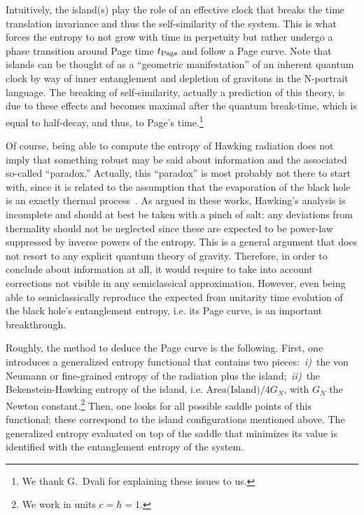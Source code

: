 \documentclass[a4paper, 12pt]{article}
\begin{document}
Intuitively, the island(s) play the role of an effective clock that breaks the time translation invariance and thus the self-similarity of the system. This is what forces the entropy to not grow with time in perpetuity but rather undergo a phase transition around Page time $t_{\rm Page}$ and follow a Page curve. Note that islands can be thought of as a ``geometric manifestation'' of an inherent quantum clock by way of inner entanglement and depletion of gravitons in the N-portrait language. The breaking of self-similarity, actually a prediction of this theory, is due to these effects and becomes maximal after the quantum break-time, which is equal to half-decay, and thus, to Page's time.\footnote{We thank G.~Dvali for explaining these issues to us.} 



Of course, being able to compute the entropy of Hawking radiation  
does not imply that something robust may be said about information and the associated so-called ``paradox.'' Actually, this ``paradox''  is most probably not there to start with, since it is related to the assumption that the evaporation of the black hole is an exactly thermal process~\cite{Dvali:2011aa,Dvali:2012rt,Dvali:2012wq,Dvali:2015aja,Dvali:2012en,Dvali:2013lva,Dvali:2013eja}. As argued in these works, Hawking's analysis is incomplete and should at best be taken with a pinch of salt: any deviations from thermality should not be neglected since these are expected to be power-law suppressed by inverse powers of the entropy. This is a general argument that does not resort to any explicit quantum theory of gravity. Therefore, in order to conclude about information at all, it would require to take into account corrections not visible in any semiclassical approximation. 
However, even being able to semiclassically reproduce the expected from unitarity time evolution of the black hole's entanglement entropy, i.e. its Page curve, is an  important breakthrough. 

Roughly, the method to deduce the Page curve is the following. First, one introduces a generalized entropy functional that contains two pieces:~\emph{i)}~the von Neumann or fine-grained entropy of the radiation plus the island;~\emph{ii)}~the Bekenstein-Hawking entropy of the island, i.e. $\text{Area(Island)}/4G_N$, with $G_N$ the Newton constant.\footnote{We work in units $c=\hbar=1$.} Then, one looks for all possible saddle points of this functional; these correspond to the island configurations mentioned above.  The generalized entropy evaluated on top of the saddle that minimizes its value is identified with the entanglement entropy of the system. 
\end{document}
